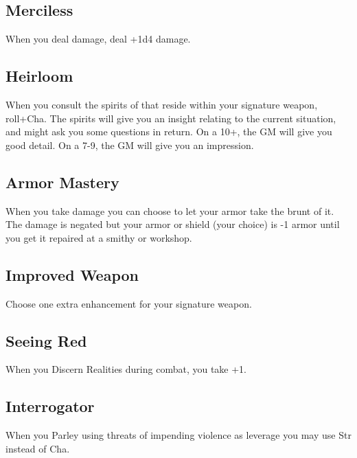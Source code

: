\subsection{Merciless}   
 

When you deal damage, deal +1d4 damage.

 
\subsection{Heirloom}   
 

When you consult the spirits of that reside within your signature weapon, roll+Cha. The spirits will give you an insight relating to the current situation, and might ask you some questions in return. On a 10+, the GM will give you good detail. On a 7-9, the GM will give you an impression.

 
\subsection{Armor Mastery}    
 

When you take damage you can choose to let your armor take the brunt of it. The damage is negated but your armor or shield (your choice) is -1 armor until you get it repaired at a smithy or workshop.

 
\subsection{Improved Weapon}    
 

Choose one extra enhancement for your signature weapon.

 
\subsection{Seeing Red}   
 

When you Discern Realities during combat, you take +1.

 
\subsection{Interrogator}   
 

When you Parley using threats of impending violence as leverage you may use Str instead of Cha.

